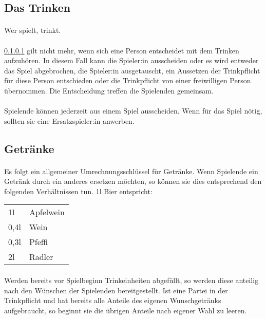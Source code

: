 \subsection{Das Trinken}
\paragraph{}\label{Allgemeine_Regelungen:Trinken:Trink}
Wer spielt, trinkt.

\paragraph{}
\ref{Allgemeine_Regelungen:Trinken:Trink} gilt nicht mehr, wenn sich eine Person entscheidet mit dem Trinken aufzuhören.
In diesem Fall kann die Spieler:in ausscheiden oder es wird entweder das Spiel abgebrochen, die Spieler:in ausgetauscht, ein Aussetzen der Trinkpflicht für diese Person entschieden oder die Trinkpflicht von einer freiwilligen Person übernommen.
Die Entscheidung treffen die Spielenden gemeinsam.

\paragraph{}
Spielende können jederzeit aus einem Spiel ausscheiden. Wenn für das Spiel nötig, sollten sie eine Ersatzspieler:in anwerben.

\subsection{Getränke}\label{Allgemeine_Regelungen:Getränke}
\paragraph{} \label{Allgemeine_Regelungen:Getränke:Umrechnung}
Es folgt ein allgemeiner Umrechnungsschlüssel für Getränke.
Wenn Spielende ein Getränk durch ein anderes ersetzen möchten, so können sie dies entsprechend den folgenden Verhältnissen tun.
1l Bier entspricht:

\begin{tabular}{l l}
	1l   & Apfelwein \\
	0,4l & Wein      \\
	0,3l & Pfeffi    \\
	2l   & Radler
\end{tabular}

\paragraph{} \label{Allgemeine_Regelungen:Getränke:Abfüllen}
Werden bereits vor Spielbeginn Trinkeinheiten abgefüllt, so werden diese anteilig nach den Wünschen der Spielenden bereitgestellt.
Ist eine Partei in der Trinkpflicht und hat bereits alle Anteile des eigenen Wunschgetränks aufgebraucht, so beginnt sie die übrigen Anteile nach eigener Wahl zu leeren.

